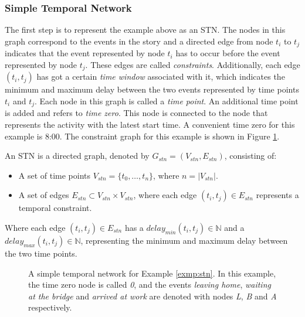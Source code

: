 \documentclass{article}
\theoremstyle{definition}
\newcommand{\mindelay}[2]{\ensuremath{delay_{min}(t_{#1}, t_{#2})}} %
\newcommand{\maxdelay}[2]{\ensuremath{delay_{max}(t_{#1}, t_{#2})}} %
\newenvironment{definition}[1][Definition]{\begin{trivlist}
\item[\hskip \labelsep {\bfseries #1}]}{\end{trivlist}}
\begin{document}
\subsubsection{Simple Temporal Network}
\label{text:stn_subsec}
The first step is to represent the example above as an STN. 
The nodes in this graph correspond to the events in the story and a directed edge from node $t_i$ to $t_j$ indicates that the event represented by node $t_i$ has to occur before the event represented by node $t_j$.
These edges are called \emph{constraints}.
Additionally, each edge $(t_i, t_j)$ has got a certain \emph{time window} associated with it, which indicates the minimum and maximum delay between the two events represented by time points $t_i$ and $t_j$. 
Each node in this graph is called a \emph{time point}. 
An additional time point is added and refers to \emph{time zero}.
This node is connected to the node that represents the activity with the latest start time.
A convenient time zero for this example is 8:00.
The constraint graph for this example is shown in Figure \ref{fig:stn_example}.

\begin{definition}
\label{text:stn_definition}
An STN is a directed graph, denoted by $G_{stn} = (V_{stn}, E_{stn})$, consisting of:
\begin{itemize}
\item A set of time points $V_{stn} = \{t_0, \ldots, t_n\}$, where $n = |V_{stn}|$.
\item A set of edges $E_{stn} \subset V_{stn} \times V_{stn}$, where each edge $(t_i, t_j) \in E_{stn}$ represents a temporal constraint. 
\end{itemize}
Where each edge $(t_i, t_j) \in E_{stn}$ has a $\mindelay{i}{j} \in \mathbb{N}$ and a $\maxdelay{i}{j} \in \mathbb{N}$, representing the minimum and maximum delay between the two time points.
\end{definition}

\begin{figure}[h]
	\label{fig:stn_example}
	\centering
	\caption{A simple temporal network for Example \ref{exmp:stn}. In this example, the time zero node is called \emph{0}, and the events \emph{leaving home},  \emph{waiting at the bridge} and \emph{arrived at work} are denoted with nodes \emph{L}, \emph{B} and \emph{A} respectively.}
\end{figure}
\end{document}
